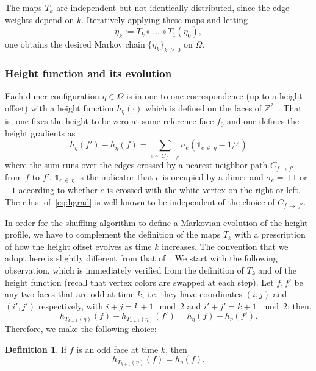 \documentclass[10pt]{amsart}
\theoremstyle{definition}\newtheorem{defi}[theo]{Definition}\newtheorem{rema}[theo]{Remark}\newtheorem{exam}[theo]{Example}\newtheorem{exem}[theo]{Example}\newtheorem{nota}[theo]{Notation}
\newcommand{\bbZ}{\mathbb{Z}}
\newcommand{\dsun}{\mathds{1}}
\begin{document}
The maps $T_k$ are independent but not identically distributed, since the edge weights depend on $k$. Iteratively applying these maps and letting
\[
\eta_k:=T_{k}\circ\,\dots\,\circ T_1(\eta_0),
\]
one obtains the desired Markov chain $\{\eta_k\}_{k\,\ge\,0}$ on $\Omega$.

\subsubsection{Height function and its evolution}
Each dimer configuration $\eta\in \Omega$ is in one-to-one correspondence (up to a height offset) with a height function $h_\eta(\cdot)$ which is defined on the faces of $\bbZ^2$~\cite{KenLectures}. That is, one fixes the height to be zero at some reference face $f_0$ and one defines the height gradients as
\begin{equation}\label{eq:hgrad}
h_\eta(f')-h_\eta(f)=\sum_{e\sim C_{f\,\to\,f'}}\sigma_e (\dsun_{e\,\in\,\eta}-1/4)
\end{equation}
where the sum runs over the edges crossed by a nearest-neighbor path $C_{f\to f'}$ from $f$ to $f'$, $\dsun_{e\,\in\,\eta}$ is the indicator that $e$ is occupied by a dimer and $\sigma_e=+1$ or $-1$ according to whether $e$ is crossed with the white vertex on the right or left. The r.h.s. of~\eqref{eq:hgrad} is well-known to be independent of the choice of $C_{f\,\to\,f'}$.


In order for the shuffling algorithm to define a Markovian evolution of the height profile, we have to complement the definition of the maps $T_k$ with a prescription of how the height offset evolves as time $k$ increases. The convention that we adopt here is slightly different from that of~\cite{CT:18,zhang2018domino}. We start with the following observation, which is immediately verified from the definition of $T_k$ and of the height function (recall that vertex colors are swapped at each step). Let $f,f'$ be any two faces that are odd at time $k$, i.e. they have coordinates $(i,j)$ and $(i',j')$ respectively, with $i+j=k+1\mod 2$ and $i'+j'=k+1\mod 2$; then,
\[
h_{T_{k+1} (\eta)}(f)-h_{T_{k+1}(\eta)}(f')=h_{\eta}(f)-h_{\eta}(f').
\]
Therefore, we make the following choice:
\begin{defi}\label{def:ho}
If $f$ is an odd face at time $k$, then
\begin{equation}\label{eq:ch1}
h_{T_{k+1} (\eta)}(f)=h_{\eta}(f).
\end{equation}
\end{defi}
\end{document}
